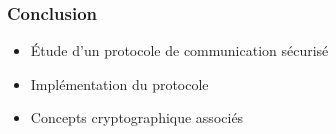 \begin{frame}
\frametitle{Conclusion}
\begin{itemize}
\item Étude d'un protocole de communication sécurisé
\item Implémentation du protocole
\item Concepts cryptographique associés
\end{itemize}
\end{frame}
